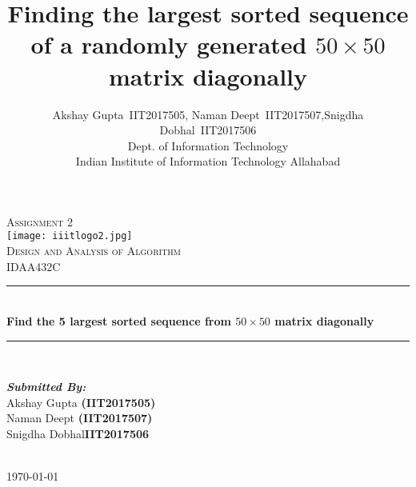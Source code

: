 \documentclass[twocolumn]{article}      %
\title{Finding the largest sorted sequence of a randomly generated $50\times50$ matrix diagonally}  %
\author{Akshay Gupta~{IIT2017505}, \hspace{6pt}Naman Deept~{IIT2017507},\hspace{6pt}Snigdha Dobhal~{IIT2017506}  \\Dept. of Information Technology\\Indian Institute of Information Technology  Allahabad
 }
\begin{document}
\begin{titlepage}

\newcommand{\HRule}{\rule{\linewidth}{0.5mm}} %

\center %
 

\textsc{\LARGE Assignment 2}\\[1.5cm] %
\texttt{[image: iiitlogo2.jpg]}\\[1cm]
\textsc{\Large Design and Analysis of Algorithm}\\[0.5cm] %
\textsc{\large IDAA432C}\\[0.5cm] %


\HRule \\[0.4cm]
{ \large \bfseries Find the 5 largest sorted sequence from $50\times50$ matrix diagonally }\\[0.4cm] %
\HRule \\[1.5cm]
 

\begin{minipage}{0.4\textwidth}
\begin{flushleft} \large
\textbf{\emph{Submitted By:}}\\
Akshay Gupta \textbf{(IIT2017505)}\\
Naman Deept \textbf{(IIT2017507)}\\
Snigdha Dobhal\textbf{IIT2017506}\\
\end{flushleft}
\end{minipage}\\[2cm]



{\large \today}\\[2cm] %

\vfill %

\end{titlepage}
\end{document}
